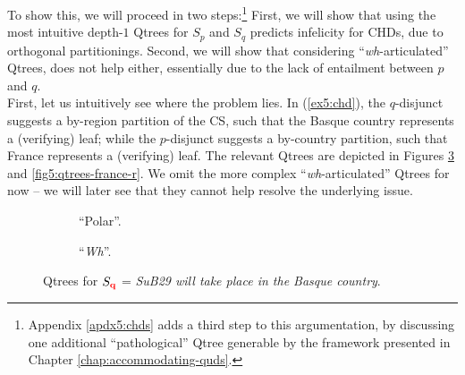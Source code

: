 To show this, we will proceed in two steps:\footnote{Appendix \ref{apdx5:chds} adds a third step to this argumentation, by discussing one additional ``pathological'' Qtree generable by the framework presented in Chapter \ref{chap:accommodating-quds}.} First, we will show that using the most intuitive depth-$1$ Qtrees for $S_p$ and $S_q$ predicts infelicity for CHDs, due to orthogonal partitionings. Second, we will show that considering ``\textit{wh}-articulated'' Qtrees, does not help either, essentially due to the lack of entailment between $p$ and $q$. \\


First, let us intuitively see where the problem lies. In (\ref{ex5:chd}), the $q$-disjunct suggests a by-region partition of the CS, such that the Basque country represents a (verifying) leaf; while the $p$-disjunct suggests a by-country partition, such that France represents a (verifying) leaf. The relevant Qtrees are depicted in Figures \ref{fig5:qtrees-basque} and \ref{fig5:qtrees-france-r}. We omit the more complex ``\textit{wh}-articulated'' Qtrees for now -- we will later see that they cannot help resolve the underlying issue.

\begin{figure}[H]
	\centering
	\begin{subfigure}[b]{.25\linewidth}
		\centering
		\caption[]{``Polar''.}\label{fig5:qtree-basque-polar}
	\end{subfigure}\hfill
	\begin{subfigure}[b]{.65\linewidth}
		\centering
		\caption[]{``\textit{Wh}''.}\label{fig5:qtree-basque-wh}
	\end{subfigure}
	\caption[]{Qtrees for $S_{\textbf{\textcolor{red}{q}}}$ = \textit{SuB29 will take place in the Basque country}.}\label{fig5:qtrees-basque}
\end{figure}

